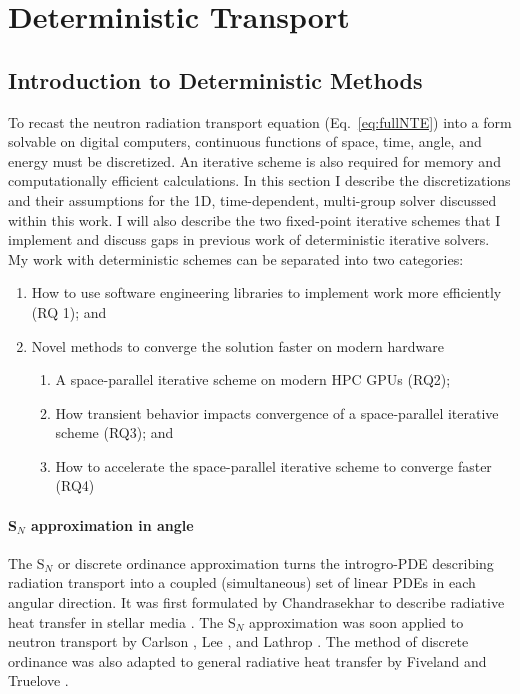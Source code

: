\part{Deterministic Transport}


\chapter{Introduction to Deterministic Methods}

To recast the neutron radiation transport equation (Eq.~\eqref{eq:fullNTE}) into a form solvable on digital computers, continuous functions of space, time, angle, and energy must be discretized.
An iterative scheme is also required for memory and computationally efficient calculations.
In this section I describe the discretizations and their assumptions for the 1D, time-dependent, multi-group solver discussed within this work.
I will also describe the two fixed-point iterative schemes that I implement and discuss gaps in previous work of deterministic iterative solvers.
My work with deterministic schemes can be separated into two categories:
\begin{enumerate}
    \item How to use software engineering libraries to implement work more efficiently (RQ 1); and
    \item Novel methods to converge the solution faster on modern hardware
    \begin{enumerate}
        \item A space-parallel iterative scheme on modern HPC GPUs (RQ2);
        \item How transient behavior impacts convergence of a space-parallel iterative scheme (RQ3); and
        \item How to accelerate the space-parallel iterative scheme to converge faster (RQ4)
    \end{enumerate}
\end{enumerate}

\subsection{S$_N$ approximation in angle}

The S$_N$ or discrete ordinance approximation turns the introgro-PDE describing radiation transport into a coupled (simultaneous) set of linear PDEs in each angular direction.
It was first formulated by Chandrasekhar to describe radiative heat transfer in stellar media \cite{chandrasekhar1960radiative}.
The S$_N$ approximation was soon applied to neutron transport by Carlson \cite{precise1971carlson}, Lee \cite{discrete1961lee}, and Lathrop \cite{discrete1966lathnrop}.
The method of discrete ordinance was also adapted to general radiative heat transfer by Fiveland \cite{three1988fiveland} and Truelove \cite{discrete1987truelove}.

